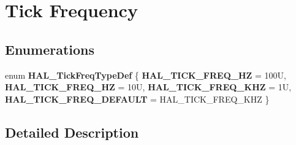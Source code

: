 \hypertarget{group___h_a_l___t_i_c_k___f_r_e_q}{}\section{Tick Frequency}
\label{group___h_a_l___t_i_c_k___f_r_e_q}
\subsection*{Enumerations}
\begin{DoxyCompactItemize}
\item 
\mbox{\label{group___h_a_l___t_i_c_k___f_r_e_q_gab36ec81674817249c46734772ff3b73a}} 
enum {\bfseries H\+A\+L\+\_\+\+Tick\+Freq\+Type\+Def} \{ {\bfseries H\+A\+L\+\_\+\+T\+I\+C\+K\+\_\+\+F\+R\+E\+Q\+\_\+HZ} = 100U, 
{\bfseries H\+A\+L\+\_\+\+T\+I\+C\+K\+\_\+\+F\+R\+E\+Q\+\_\+HZ} = 10U, 
{\bfseries H\+A\+L\+\_\+\+T\+I\+C\+K\+\_\+\+F\+R\+E\+Q\+\_\+K\+HZ} = 1U, 
{\bfseries H\+A\+L\+\_\+\+T\+I\+C\+K\+\_\+\+F\+R\+E\+Q\+\_\+\+D\+E\+F\+A\+U\+LT} = H\+A\+L\+\_\+\+T\+I\+C\+K\+\_\+\+F\+R\+E\+Q\+\_\+K\+HZ
 \}
\end{DoxyCompactItemize}


\subsection{Detailed Description}
